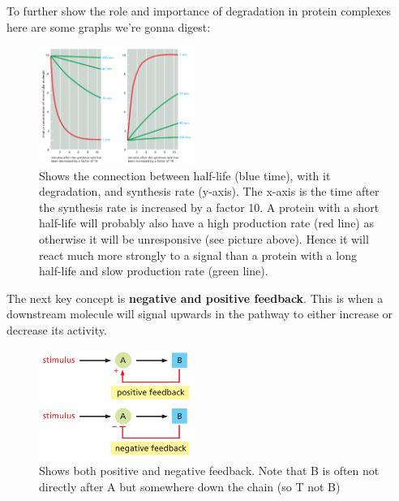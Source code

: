 \documentclass[../main.tex]{subfiles}
\begin{document}
To further show the role and importance of degradation in protein complexes here are some graphs we're gonna digest: 
\begin{figure}[H]
	\centering
	\includegraphics[width=0.45\textwidth]{reg_graph}
	\caption{Shows the connection between half-life (blue time), with it degradation, and synthesis rate (y-axis). The x-axis is the time after the synthesis rate is increased by a factor 10. A protein with a short half-life will probably also have a high production rate (red line) as otherwise it will be unresponsive (see picture above). Hence it will react much more strongly to a signal than a protein with a long half-life and slow production rate (green line).}
\end{figure}



The next key concept is \textbf{negative and positive feedback}. This is when a downstream molecule will signal upwards in the pathway to either increase or decrease its activity.
\begin{figure}[H]
	\centering
	\includegraphics[width=0.45\textwidth]{reg_feed}
	\caption{Shows both positive and negative feedback. Note that B is often not directly after A but somewhere down the chain (so T not B)}
\end{figure}
\end{document}
